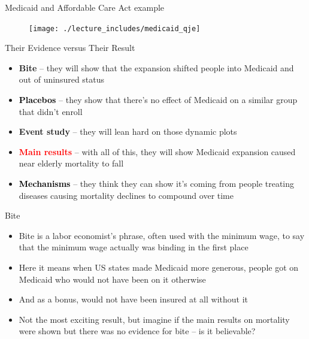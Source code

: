 \documentclass{beamer}
\begin{document}
\begin{frame}{Medicaid and Affordable Care Act example}

\begin{figure}
\texttt{[image: ./lecture\_includes/medicaid\_qje]}
\end{figure}

\end{frame}
\begin{frame}{Their Evidence versus Their Result}

\begin{itemize}
\item \textbf{Bite} -- they will show that the expansion shifted people into Medicaid and out of uninsured status
\item \textcolor{black}{\textbf{Placebos}} -- they show that there's no effect of Medicaid on a similar group that didn't enroll
\item \textbf{Event study} -- they will lean hard on those dynamic plots
\item \textcolor{red}{\textbf{Main results}} -- with all of this, they will show Medicaid expansion caused near elderly mortality to fall
\item \textcolor{black}{\textbf{Mechanisms}} -- they think they can show it's coming from people treating diseases causing mortality declines to compound over time
\end{itemize}

\end{frame}

\begin{frame}{Bite}

\begin{itemize}
\item Bite is a labor economist's phrase, often used with the minimum wage, to say that the minimum wage actually was binding in the first place
\item Here it means when US states made Medicaid more generous, people got on Medicaid who would not have been on it otherwise
\item And as a bonus, would not have been insured at all without it
\item Not the most exciting result, but imagine if the main results on mortality were shown but there was no evidence for bite -- is it believable?
\end{itemize}

\end{frame}


\end{document}
